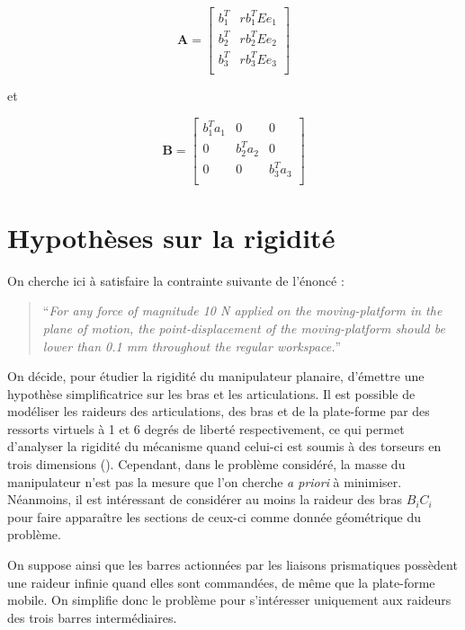 \documentclass{article}
\begin{document}
\begin{multicols*}{2}
\begin{equation*}
    \mathbf{A} = \begin{bmatrix}
    b_1^T & rb_1^TEe_1\\
    b_2^T & rb_2^TEe_2\\
    b_3^T & rb_3^TEe_3\\
    \end{bmatrix}
\end{equation*}

et 

\begin{equation*}
    \mathbf{B} = \begin{bmatrix}
    b_1^T a_1 & 0 & 0\\
    0 & b_2^T a_2& 0\\
    0 & 0 & b_3^T a_3\\
    \end{bmatrix}
\end{equation*}

    \section*{Hypothèses sur la rigidité}

On cherche ici à satisfaire la contrainte suivante de l'énoncé :

\begin{quote}``\textit{For any force of magnitude 10 N applied on the moving-platform in the plane of motion, the point-displacement of the moving-platform should be lower than 0.1 mm throughout the regular workspace.}''
\end{quote}

On décide, pour étudier la rigidité du manipulateur planaire, d'émettre une hypothèse simplificatrice sur les bras et les articulations. Il est possible de modéliser les raideurs des articulations, des bras et de la plate-forme par des ressorts virtuels à 1 et 6 degrés de liberté respectivement, ce qui permet d'analyser la rigidité du mécanisme quand celui-ci est soumis à des torseurs en trois dimensions (\cite{caro11}). Cependant, dans le problème considéré, la masse du manipulateur n'est pas la mesure que l'on cherche \textit{a priori} à minimiser. Néanmoins, il est intéressant de considérer au moins la raideur des bras $B_i C_i$ pour faire apparaître les sections de ceux-ci comme donnée géométrique du problème.

On suppose ainsi que les barres actionnées par les liaisons prismatiques possèdent une raideur infinie quand elles sont commandées, de même que la plate-forme mobile. On simplifie donc le problème pour s'intéresser uniquement aux raideurs des trois barres intermédiaires.


\end{multicols*}
\end{document}
